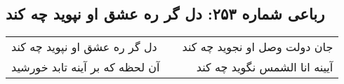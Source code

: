 \begin{center}
\section*{رباعی شماره ۲۵۳: دل گر ره عشق او نپوید چه کند}
\label{sec:sh253}
\begin{longtable}{l p{0.5cm} r}
دل گر ره عشق او نپوید چه کند
&&
جان دولت وصل او نجوید چه کند
\\
آن لحظه که بر آینه تابد خورشید
&&
آیینه انا الشمس نگوید چه کند
\\
\end{longtable}
\end{center}

